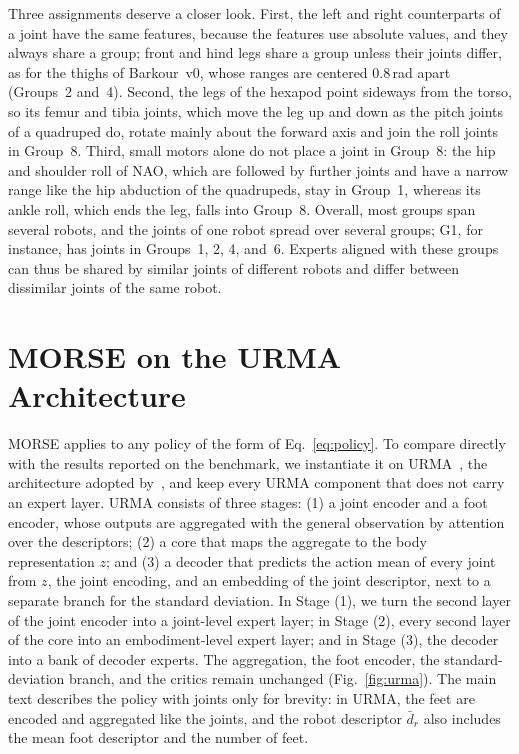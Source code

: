 Three assignments deserve a closer look. First, the left and right counterparts of a joint have the same features,
because the features use absolute values, and they always share a group; front and hind legs share a group unless
their joints differ, as for the thighs of Barkour~v0, whose ranges are centered 0.8\,rad apart (Groups~2 and~4).
Second, the legs of the hexapod point sideways from the torso, so its femur and tibia joints, which move the leg up
and down as the pitch joints of a quadruped do, rotate mainly about the forward axis and join the roll joints in
Group~8. Third, small motors alone do not place a joint in Group~8: the hip and shoulder roll of NAO, which are
followed by further joints and have a narrow range like the hip abduction of the quadrupeds, stay in Group~1, whereas
its ankle roll, which ends the leg, falls into Group~8. Overall, most groups span several robots, and the joints of
one robot spread over several groups; G1, for instance, has joints in Groups~1, 2, 4, and~6. Experts aligned with
these groups can thus be shared by similar joints of different robots and differ between dissimilar joints of the
same robot.

\section{MORSE on the URMA Architecture}
\label{supp:urma}

MORSE applies to any policy of the form of Eq.~\eqref{eq:policy}. To compare directly with the results reported on
the benchmark, we instantiate it on URMA~\citep{bohlinger2024onepolicy}, the architecture adopted
by~\citet{abe2026crossembodimentoffline}, and keep every URMA component that does not carry an expert layer. URMA
consists of three stages: (1) a joint encoder and a foot encoder, whose outputs are aggregated with the general
observation by attention over the descriptors; (2) a core that maps the aggregate to the body representation $z$; and
(3) a decoder that predicts the action mean of every joint from $z$, the joint encoding, and an embedding of the joint
descriptor, next to a separate branch for the standard deviation. In Stage (1), we turn the second layer of the joint
encoder into a joint-level expert layer; in Stage (2), every second layer of the core into an embodiment-level expert
layer; and in Stage (3), the decoder into a bank of decoder experts. The aggregation, the foot encoder, the
standard-deviation branch, and the critics remain unchanged (Fig.~\ref{fig:urma}). The main text describes the
policy with joints only for brevity: in URMA, the feet are encoded and aggregated like the joints, and the robot
descriptor $\bar d_r$ also includes the mean foot descriptor and the number of feet.


